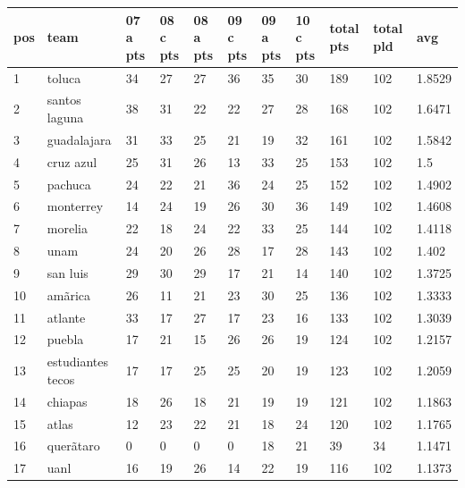 \documentclass{article}
\begin{document}
\begin{tabular}{lllllllllll}
\toprule
pos & team & 07 a pts & 08 c pts & 08 a pts & 09 c pts & 09 a pts & 10 c pts & total pts & total pld & avg \\
\midrule
1 & toluca & 34 & 27 & 27 & 36 & 35 & 30 & 189 & 102 & 1.8529 \\
2 & santos laguna & 38 & 31 & 22 & 22 & 27 & 28 & 168 & 102 & 1.6471 \\
3 & guadalajara & 31 & 33 & 25 & 21 & 19 & 32 & 161 & 102 & 1.5842 \\
4 & cruz azul & 25 & 31 & 26 & 13 & 33 & 25 & 153 & 102 & 1.5 \\
5 & pachuca & 24 & 22 & 21 & 36 & 24 & 25 & 152 & 102 & 1.4902 \\
6 & monterrey & 14 & 24 & 19 & 26 & 30 & 36 & 149 & 102 & 1.4608 \\
7 & morelia & 22 & 18 & 24 & 22 & 33 & 25 & 144 & 102 & 1.4118 \\
8 & unam & 24 & 20 & 26 & 28 & 17 & 28 & 143 & 102 & 1.402 \\
9 & san luis & 29 & 30 & 29 & 17 & 21 & 14 & 140 & 102 & 1.3725 \\
10 & amãrica & 26 & 11 & 21 & 23 & 30 & 25 & 136 & 102 & 1.3333 \\
11 & atlante & 33 & 17 & 27 & 17 & 23 & 16 & 133 & 102 & 1.3039 \\
12 & puebla & 17 & 21 & 15 & 26 & 26 & 19 & 124 & 102 & 1.2157 \\
13 & estudiantes tecos & 17 & 17 & 25 & 25 & 20 & 19 & 123 & 102 & 1.2059 \\
14 & chiapas & 18 & 26 & 18 & 21 & 19 & 19 & 121 & 102 & 1.1863 \\
15 & atlas & 12 & 23 & 22 & 21 & 18 & 24 & 120 & 102 & 1.1765 \\
16 & querãtaro & 0 & 0 & 0 & 0 & 18 & 21 & 39 & 34 & 1.1471 \\
17 & uanl & 16 & 19 & 26 & 14 & 22 & 19 & 116 & 102 & 1.1373 \\
\bottomrule
\end{tabular}
\end{document}
